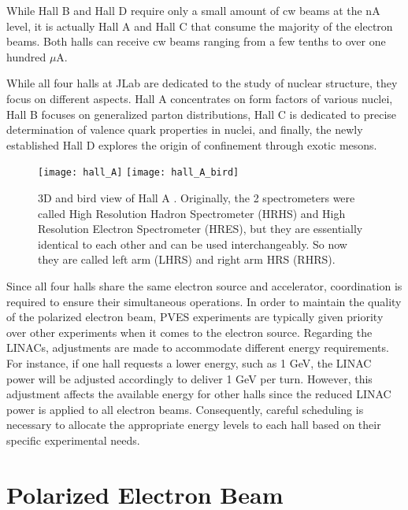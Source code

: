 While Hall B and Hall D require only a small amount of cw beams at the nA level, it is actually Hall A and Hall C that consume the majority of the electron beams. Both halls can receive cw beams ranging from a few tenths to over one hundred $\mu$A. 

While all four halls at JLab are dedicated to the study of nuclear structure, they
focus on different aspects. Hall A concentrates on form factors of various nuclei, 
Hall B focuses on generalized parton distributions, Hall C is dedicated to precise
determination of valence quark properties in nuclei, and finally, the newly 
established Hall D explores the origin of confinement through exotic mesons.
\begin{figure}[!h]
    \centering
    \texttt{[image: hall\_A]}
    \texttt{[image: hall\_A\_bird]}
    \caption[Hall A]
    {3D and bird view of Hall A \cite{halla_manual}. Originally, the 2 spectrometers
    were called High Resolution Hadron Spectrometer (HRHS) and High Resolution Electron
    Spectrometer (HRES), but they are essentially identical to each other and
    can be used interchangeably.
    So now they are called left arm (LHRS) and right arm HRS (RHRS).
    }
\end{figure}

Since all four halls share the same electron source and accelerator, 
coordination is required to ensure their simultaneous operations. 
In order to maintain the quality of the polarized electron beam, PVES experiments are typically given priority over other experiments when it comes to the electron source. Regarding the LINACs, adjustments are made to accommodate different energy requirements. For instance, if one hall requests a lower energy, such as 1 GeV, the LINAC power will be adjusted accordingly to deliver 1 GeV per turn. However, this adjustment affects the available energy for other halls since the reduced LINAC power is applied to all electron beams. Consequently, careful scheduling is necessary to allocate the appropriate energy levels to each hall based on their specific experimental needs.
\section{Polarized Electron Beam}


